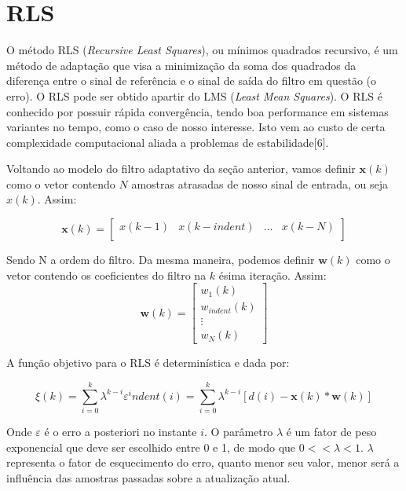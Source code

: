 \documentclass[a4paper, 12pt]{book}
\begin{document}
\section{RLS}

\indent O método RLS (\textit{Recursive Least Squares}), ou mínimos quadrados recursivo, é um método de adaptação que visa a minimização da soma dos quadrados da diferença entre o sinal de referência e o sinal de saída do filtro em questão (o erro). O RLS pode ser obtido apartir do LMS (\textit{Least Mean Squares}). O RLS é conhecido por possuir rápida convergência, tendo boa performance em sistemas variantes no tempo, como o caso de nosso interesse. Isto vem ao custo de certa complexidade computacional aliada a problemas de estabilidade[6].

\indent Voltando ao modelo do filtro adaptativo da seção anterior, vamos definir $\boldsymbol{x}(k)$ como o vetor contendo $N$ amostras atrasadas de nosso sinal de entrada, ou seja $x(k)$. Assim:

\begin{equation}
    \boldsymbol{x}(k)=
    \begin{bmatrix}
        x(k-1) & x(k-indent) & \dots & x(k-N) \\
    \end{bmatrix}
\end{equation}

\indent Sendo N a ordem do filtro. Da mesma maneira, podemos definir $\boldsymbol{w}(k)$ como o vetor contendo os coeficientes do filtro na $k$ ésima iteração. Assim:
\begin{equation}
    \boldsymbol{w}(k)=
    \begin{bmatrix}
    w_{1}(k)  \\
    w_{indent}(k)  \\
    \vdots  \\
    w_{N}(k) 
    \end{bmatrix}
    
\end{equation}

\indent A função objetivo para o RLS é determinística e dada por:

\Large
\begin{equation}
    \xi(k)=\sum_{i=0}^{k}\lambda^{k-i}\varepsilon^indent(i)
    =\sum_{i=0}^{k}\lambda^{k-i}[d(i)-\boldsymbol{x}(k)*\boldsymbol{w}(k)]
\end{equation}
\normalsize

\indent Onde $\varepsilon$ é o erro a posteriori no instante $i$. O parâmetro $\lambda$ é um fator de peso exponencial que deve ser escolhido entre 0 e 1, de modo que $0 << \lambda < 1$. $\lambda$ representa o fator de esquecimento do erro, quanto menor seu valor, menor será a influência das amostras passadas sobre a atualização atual.
\end{document}
